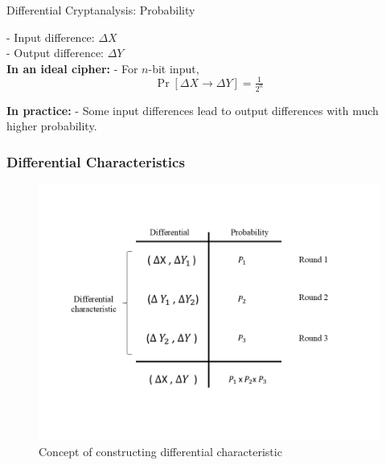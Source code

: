 \documentclass{beamer}
\begin{document}
\begin{frame}{Differential Cryptanalysis: Probability}

- Input difference: $\Delta X$ \\ 
- Output difference: $\Delta Y$ \\
\bigskip
\textbf{In an ideal cipher:}  
- For $n$-bit input,  
\[
\Pr[\Delta X \to \Delta Y] = \tfrac{1}{2^n}
\]

\bigskip
\textbf{In practice:}  
- Some input differences lead to output differences with much higher probability.  

\end{frame}


\begin{frame}
\frametitle{Differential Characteristics}

\begin{figure}
    \centering
    \includegraphics[width=0.8\linewidth]{fig/difchar.png}
    \caption{Concept of constructing differential characteristic}
    \label{fig:difchar}
\end{figure}

\end{frame}
\end{document}
